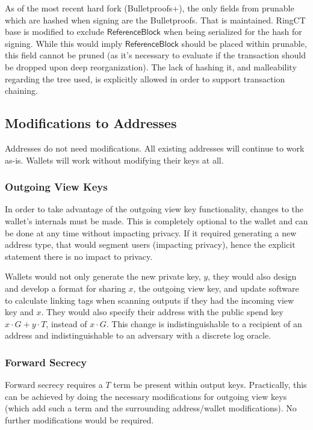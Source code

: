 \documentclass[]{article}
\begin{document}
As of the most recent hard fork (Bulletproofs+), the only fields from prunable which are hashed when signing are the Bulletproofs. That is maintained. RingCT base is modified to exclude $\mathsf{ReferenceBlock}$ when being serialized for the hash for signing. While this would imply $\mathsf{ReferenceBlock}$ should be placed within prunable, this field cannot be pruned (as it's necessary to evaluate if the transaction should be dropped upon deep reorganization). The lack of hashing it, and malleability regarding the tree used, is explicitly allowed in order to support transaction chaining.

\subsection{Modifications to Addresses}

Addresses do not need modifications. All existing addresses will continue to work as-is. Wallets will work without modifying their keys at all.

\subsubsection{Outgoing View Keys}

In order to take advantage of the outgoing view key functionality, changes to the wallet's internals must be made. This is completely optional to the wallet and can be done at any time without impacting privacy. If it required generating a new address type, that would segment users (impacting privacy), hence the explicit statement there is no impact to privacy.

Wallets would not only generate the new private key, $y$, they would also design and develop a format for sharing $x$, the outgoing view key, and update software to calculate linking tags when scanning outputs if they had the incoming view key and $x$. They would also specify their address with the public spend key $x \cdot G + y \cdot T$, instead of $x \cdot G$. This change is indistinguishable to a recipient of an address and indistinguishable to an adversary with a discrete log oracle.

\subsubsection{Forward Secrecy}

Forward secrecy requires a $T$ term be present within output keys. Practically, this can be achieved by doing the necessary modifications for outgoing view keys (which add such a term and the surrounding address/wallet modifications). No further modifications would be required.
\end{document}
